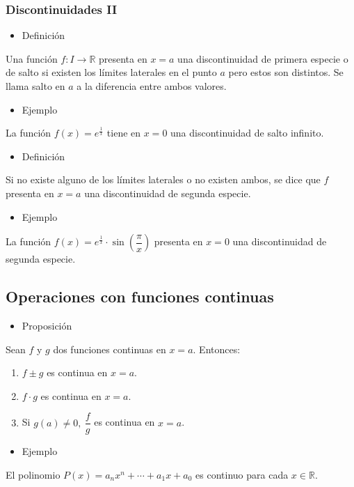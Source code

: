 \subsubsection{Discontinuidades II}
\begin{itemize}[label=\color{red}\textbullet, leftmargin=*]
	\item \color{lightblue}Definición
\end{itemize}
Una función $f:I\rightarrow\mathbb{R}$ presenta en $x=a$ una discontinuidad de primera especie o de salto si existen los límites laterales en el punto $a$ pero estos son distintos. Se llama salto en $a$ a la diferencia entre ambos valores.
\begin{itemize}[label=\color{red}\textbullet, leftmargin=*]
	\item \color{lightblue}Ejemplo
\end{itemize}
La función $f(x)=e^{\frac{1}{x}}$ tiene en $x=0$ una discontinuidad de salto infinito.
\begin{itemize}[label=\color{red}\textbullet, leftmargin=*]
	\item \color{lightblue}Definición
\end{itemize}
Si no existe alguno de los límites laterales o no existen ambos, se dice que $f$ presenta en $x=a$ una discontinuidad de segunda especie.
\begin{itemize}[label=\color{red}\textbullet, leftmargin=*]
	\item \color{lightblue}Ejemplo
\end{itemize}
La función $f(x)=e^{\frac{1}{x}}\cdot\sin\left(\dfrac{\pi}{x}\right)$ presenta en $x=0$ una discontinuidad de segunda especie.
\subsection{Operaciones con funciones continuas}
\begin{itemize}[label=\color{red}\textbullet, leftmargin=*]
	\item \color{lightblue}Proposición
\end{itemize}
Sean $f$ y $g$ dos funciones continuas en $x=a$. Entonces:
\begin{enumerate}[label=\arabic*)]
	\item $f\pm g$ es continua en $x=a$.
	\item $f\cdot g$ es continua en $x=a$.
	\item Si $g(a)\neq0,~\dfrac{f}{g}$ es continua en $x=a$.
\end{enumerate}
\begin{itemize}[label=\color{red}\textbullet, leftmargin=*]
	\item \color{lightblue}Ejemplo
\end{itemize}
El polinomio $P(x)=a_nx^n+\cdots+a_1x+a_0$ es continuo para cada $x\in\mathbb{R}$.
